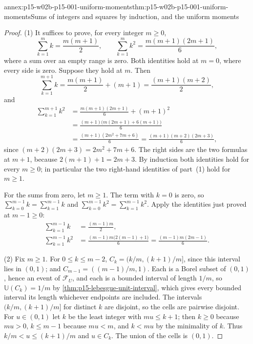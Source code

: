 \begin{annexitem}{annex:p15-w02b-p15-001-uniform-moments}{thm:p15-w02b-p15-001-uniform-moments}{Sums of integers and squares by induction, and the uniform moments}
\begin{proof}
(1) It suffices to prove, for every integer \(m\geq0\),
\[
 \sum_{k=1}^{m}k=\frac{m(m+1)}2,\qquad
 \sum_{k=1}^{m}k^2=\frac{m(m+1)(2m+1)}6,
\]
where a sum over an empty range is zero. Both identities hold at
\(m=0\), where every side is zero. Suppose they hold at \(m\). Then
\[
 \sum_{k=1}^{m+1}k=\frac{m(m+1)}2+(m+1)=\frac{(m+1)(m+2)}2,
\]
and
\[
 \begin{aligned}
 \sum_{k=1}^{m+1}k^2&=\frac{m(m+1)(2m+1)}6+(m+1)^2\\
 &=\frac{(m+1)\bigl(m(2m+1)+6(m+1)\bigr)}6\\
 &=\frac{(m+1)(2m^2+7m+6)}6=\frac{(m+1)(m+2)(2m+3)}6,
 \end{aligned}
\]
since \((m+2)(2m+3)=2m^2+7m+6\). The right sides are the two formulas
at \(m+1\), because \(2(m+1)+1=2m+3\). By induction both identities
hold for every \(m\geq0\); in particular the two right-hand identities
of part~(1) hold for \(m\geq1\).

For the sums from zero, let \(m\geq1\). The term with \(k=0\) is zero,
so \(\sum_{k=0}^{m-1}k=\sum_{k=1}^{m-1}k\) and
\(\sum_{k=0}^{m-1}k^2=\sum_{k=1}^{m-1}k^2\). Apply the identities just
proved at \(m-1\geq0\):
\[
 \begin{aligned}
 \sum_{k=1}^{m-1}k&=\frac{(m-1)m}2,\\
 \sum_{k=1}^{m-1}k^2&=\frac{(m-1)m\bigl(2(m-1)+1\bigr)}6
 =\frac{(m-1)m(2m-1)}6.
 \end{aligned}
\]

(2) Fix \(m\geq1\). For \(0\leq k\leq m-2\),
\(C_k=(k/m,(k+1)/m]\), since this interval lies in \((0,1)\); and
\(C_{m-1}=((m-1)/m,1)\). Each is a Borel subset of \((0,1)\), hence an
event of \(\mathcal F_U\), and each is a bounded interval of length
\(1/m\), so \(\mathbb U(C_k)=1/m\) by
\cref{thm:p15-lebesgue-unit-interval}, which gives every bounded interval
its length whichever endpoints are included. The intervals
\((k/m,(k+1)/m]\) for distinct \(k\) are disjoint, so the cells are
pairwise disjoint. For \(u\in(0,1)\) let \(k\) be the least integer with
\(mu\leq k+1\); then \(k\geq0\) because \(mu>0\), \(k\leq m-1\) because
\(mu<m\), and \(k<mu\) by the minimality of \(k\). Thus
\(k/m<u\leq(k+1)/m\) and \(u\in C_k\). The union of the cells is
\((0,1)\).


\end{proof}
\end{annexitem}
